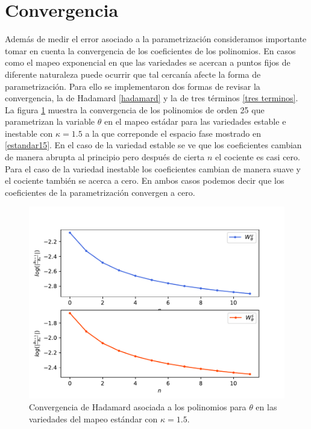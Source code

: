 \section{Convergencia}
Además de medir el error asociado a la parametrización consideramos importante tomar en cuenta la convergencia de los coeficientes de los polinomios. En casos como el mapeo exponencial en que las variedades se acercan a puntos fijos de diferente naturaleza puede ocurrir que tal cercanía afecte la forma de parametrización. Para ello se implementaron dos formas de revisar la convergencia, la de Hadamard \ref{hadamard} y la de tres términos \ref{tres terminos}. \\

La figura \ref{convergenciaEst15} muestra la convergencia de los polinomios de orden 25 que parametrizan la variable $\theta$ en el mapeo estádar para las variedades estable e inestable con $\kappa=1.5$ a la que correponde el espacio fase mostrado en \ref{estandar15}. En el caso de la variedad estable se ve que los coeficientes cambian de manera abrupta al principio pero después de cierta $n$ el cociente es casi cero. Para el caso de la variedad inestable los coeficientes cambian de manera suave y el cociente también se acerca a cero. En ambos casos podemos decir que los coeficientes de la parametrización convergen a cero.  
\begin{figure}[H]
\centering
\includegraphics[scale=0.5]{converEst15}
\caption{Convergencia de Hadamard asociada a los polinomios para $\theta$ en las variedades del mapeo estándar con $\kappa=1.5$.}
\label{convergenciaEst15}
\end{figure}

